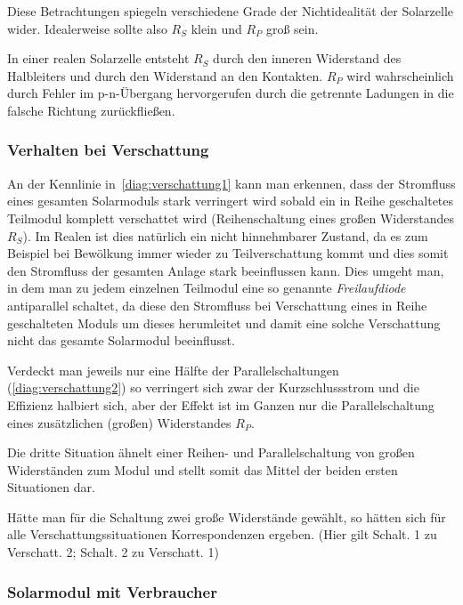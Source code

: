 \documentclass[slug=SZ, room=Hermann-Krone-Bau\,\ Labor\ 1.25,
supervisor=Martin\ Kroll, coursedate=14.\ 11.\ 2019]{../../Lab_Report_LaTeX/lab_report}
\begin{document}
Diese Betrachtungen spiegeln verschiedene Grade der Nichtidealit\"at
der Solarzelle wider. Idealerweise sollte also \(R_S\) klein und
\(R_P\) gro\ss{} sein.

In einer realen Solarzelle entsteht \(R_S\) durch den inneren
Widerstand des Halbleiters und durch den Widerstand an den Kontakten.
\(R_P\) wird wahrscheinlich durch Fehler im p-n-\"Ubergang
hervorgerufen durch die getrennte Ladungen in die falsche
Richtung zurückfließen.


\subsubsection{Verhalten bei Verschattung}
\label{sec:verschattung}


An der Kennlinie in~\ref{diag:verschattung1} kann man erkennen, dass
der Stromfluss eines gesamten Solarmoduls stark verringert wird sobald
ein in Reihe geschaltetes Teilmodul komplett verschattet wird
(Reihenschaltung eines gro\ss{}en Widerstandes \(R_S\)).  Im Realen
ist dies natürlich ein nicht hinnehmbarer Zustand, da es zum Beispiel
bei Bewölkung immer wieder zu Teilverschattung kommt und dies somit
den Stromfluss der gesamten Anlage stark beeinflussen kann.  Dies
umgeht man, in dem man zu jedem einzelnen Teilmodul eine so genannte
\emph{Freilaufdiode}\cite{wikipedia_solmod}
antiparallel schaltet, da diese den
Stromfluss bei Verschattung eines in Reihe geschalteten Moduls um
dieses herumleitet und damit eine solche Verschattung nicht das
gesamte Solarmodul beeinflusst.

Verdeckt man jeweils nur eine H\"alfte der Parallelschaltungen
(\ref{diag:verschattung2}) so verringert sich zwar der
Kurzschlussstrom und die Effizienz halbiert sich, aber der Effekt ist
im Ganzen nur die Parallelschaltung eines zus\"atzlichen (großen)
Widerstandes \(R_P\).

Die dritte Situation \"ahnelt einer Reihen- und Parallelschaltung von
gro\ss{}en Widerst\"anden zum Modul und stellt somit das Mittel der
beiden ersten Situationen dar.

H\"atte man f\"ur die Schaltung zwei gro\ss{}e Widerst\"ande gew\"ahlt, so
h\"atten sich f\"ur alle Verschattungssituationen Korrespondenzen
ergeben. (Hier gilt Schalt. 1 zu Verschatt. 2; Schalt. 2 zu Verschatt. 1)

\subsubsection{Solarmodul mit Verbraucher}
\label{sec:analyseverbr}
\end{document}
